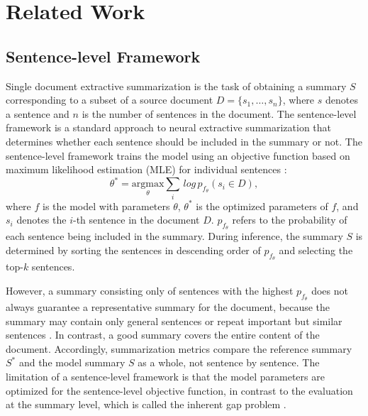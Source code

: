 \section{Related Work}
\subsection{Sentence-level Framework}

Single document extractive summarization is the task of obtaining a summary $S$ corresponding to a subset of a source document $D = \{s_1, \ldots, s_n\}$, where $s$ denotes a sentence and $n$ is the number of sentences in the document. The sentence-level framework is a standard approach to neural extractive summarization that determines whether each sentence should be included in the summary or not. The sentence-level framework trains the model using an objective function based on maximum likelihood estimation (MLE) for individual sentences \citep{nallapati_summarunner_2017, liu-lapata-2019-text}:
\begin{equation}
\label{eq1}
\theta^* = \underset{\theta}{\text{argmax}} \underset{i}\sum \, log \, p_{f_{\theta}}(s_i \in D),
\end{equation}
where $f$ is the model with parameters $\theta$, $\theta^*$ is the optimized parameters of $f$, and $s_i$ denotes the $i$-th sentence in the document $D$. $p_{f_{\theta}}$ refers to the probability of each sentence being included in the summary. During inference, the summary $S$ is determined by sorting the sentences in descending order of $p_{f_{\theta}}$ and selecting the top-$k$ sentences.

However, a summary consisting only of sentences with the highest $p_{f_{\theta}}$ does not always guarantee a representative summary for the document, because the summary may contain only general sentences or repeat important but similar sentences \citep{narayan-etal-2018-ranking, zhong-etal-2020-extractive}. In contrast, a good summary covers the entire content of the document. Accordingly, summarization metrics \citep{lin-2004-rouge, Zhang*2020BERTScore:, NEURIPS2021_e4d2b6e6, zhao-etal-2019-moverscore} compare the reference summary $S^*$ and the model summary $S$ as a whole, not sentence by sentence. The limitation of a sentence-level framework is that the model parameters are optimized for the sentence-level objective function, in contrast to the evaluation at the summary level, which is called the inherent gap problem \citep{narayan-etal-2018-ranking, zhong-etal-2020-extractive}.

